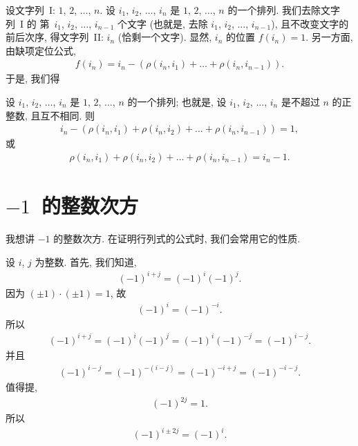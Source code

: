 \documentclass[../libro.tex]{subfiles}
\begin{document}
设文字列~I: \(1\), \(2\), \(\dots\), \(n\).
设 \(i_1\), \(i_2\), \(\dots\), \(i_n\) 是
\(1\), \(2\), \(\dots\), \(n\) 的一个排列.
我们去除文字列~I 的%
第~\(i_1\), \(i_2\), \(\dots\), \(i_{n-1}\) 个文字
(也就是, 去除 \(i_1\), \(i_2\), \(\dots\), \(i_{n-1}\)),
且不改变文字的前后次序,
得文字列~II: \(i_n\)
(恰剩一个文字).
显然, \(i_n\) 的位置 \(f(i_n) = 1\).
另一方面, 由缺项定位公式,
\begin{align*}
    f(i_n) = i_n - (\rho(i_n, i_1) + \dots + \rho(i_n, i_{n-1})).
\end{align*}
于是, 我们得

\begin{theorem}
    设
    \(i_1\), \(i_2\), \(\dots\), \(i_n\)
    是
    \(1\), \(2\), \(\dots\), \(n\)
    的一个排列;
    也就是, 设
    \(i_1\), \(i_2\), \(\dots\), \(i_n\)
    是不超过 \(n\) 的正整数, 且互不相同.
    则
    \begin{align*}
        i_n - (\rho(i_n, i_1) + \rho(i_n, i_2)
        + \dots + \rho(i_n, i_{n-1})) = 1,
    \end{align*}
    或
    \begin{align*}
        \rho(i_n, i_1) + \rho(i_n, i_2)
        + \dots + \rho(i_n, i_{n-1}) = i_n - 1.
    \end{align*}
\end{theorem}

\section{\texorpdfstring{\(-1\)~的整数次方}%
{-1 的整数次方}}

我想讲 \(-1\) 的整数次方.
在证明行列式的公式时,
我们会常用它的性质.

设 \(i\), \(j\) 为整数.
首先, 我们知道,
\begin{align*}
    (-1)^{i+j} = (-1)^{i} (-1)^{j}.
\end{align*}
因为 \((\pm 1) \cdot (\pm 1) = 1\), 故
\begin{align*}
    (-1)^{i} = (-1)^{-i}.
\end{align*}
所以
\begin{align*}
    (-1)^{i+j} = (-1)^{i} (-1)^{j}
    = (-1)^{i} (-1)^{-j}
    = (-1)^{i-j}.
\end{align*}
并且
\begin{align*}
    (-1)^{i-j} = (-1)^{-(i-j)} = (-1)^{-i+j}
    = (-1)^{-i-j}.
\end{align*}
值得提,
\begin{align*}
    (-1)^{2j} = 1.
\end{align*}
所以
\begin{align*}
    (-1)^{i \pm 2j} = (-1)^{i}.
\end{align*}
\end{document}
